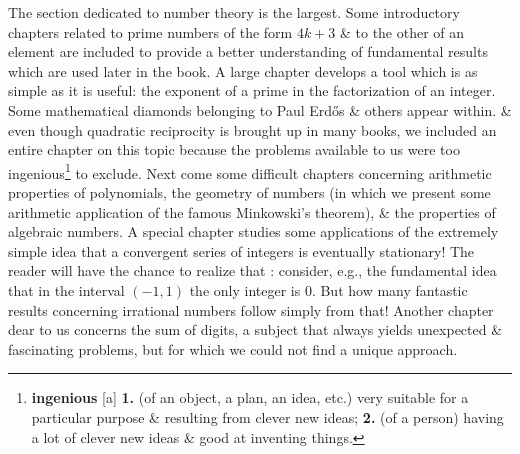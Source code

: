 \documentclass[oneside]{book}
\numberwithin{equation}{section}
\begin{document}
The section dedicated to number theory is the largest. Some introductory chapters related to prime numbers of the form $4k + 3$ \& to the other of an element are included to provide a better understanding of fundamental results which are used later in the book. A large chapter develops a tool which is as simple as it is useful: the exponent of a prime in the factorization of an integer. Some mathematical diamonds belonging to Paul Erd\H{o}s \& others appear within. \& even though quadratic reciprocity is brought up in many books, we included an entire chapter on this topic because the problems available to us were too ingenious\footnote{\textbf{ingenious} [a] \textbf{1.} (of an object, a plan, an idea, etc.) very suitable for a particular purpose \& resulting from clever new ideas; \textbf{2.} (of a person) having a lot of clever new ideas \& good at inventing things.} to exclude. Next come some difficult chapters concerning arithmetic properties of polynomials, the geometry of numbers (in which we present some arithmetic application of the famous Minkowski's theorem), \& the properties of algebraic numbers. A special chapter studies some applications of the extremely simple idea that a convergent series of integers is eventually stationary! The reader will have the chance to realize that : consider, e.g., the fundamental idea that in the interval $(-1,1)$ the only integer is $0$. But how many fantastic results concerning irrational numbers follow simply from that! Another chapter dear to us concerns the sum of digits, a subject that always yields unexpected \& fascinating problems, but for which we could not find a unique approach.
\end{document}
